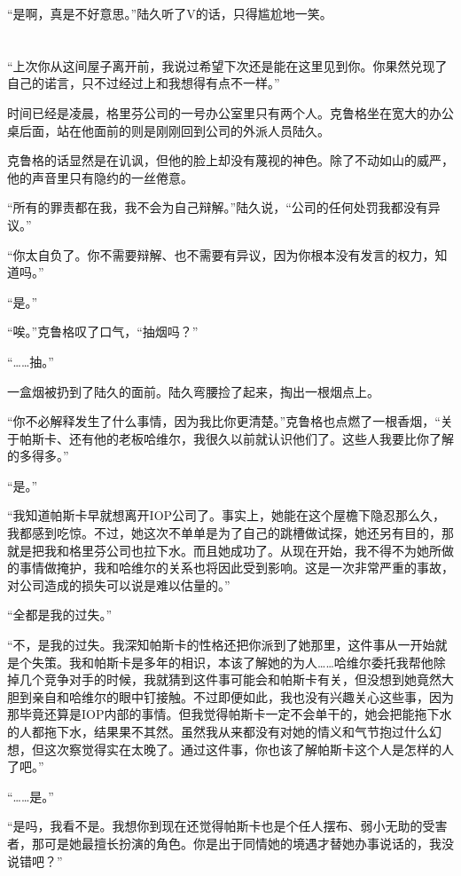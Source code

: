 “是啊，真是不好意思。”陆久听了V的话，只得尴尬地一笑。

\section*{}

“上次你从这间屋子离开前，我说过希望下次还是能在这里见到你。你果然兑现了自己的诺言，只不过经过上和我想得有点不一样。”

时间已经是凌晨，格里芬公司的一号办公室里只有两个人。克鲁格坐在宽大的办公桌后面，站在他面前的则是刚刚回到公司的外派人员陆久。

克鲁格的话显然是在讥讽，但他的脸上却没有蔑视的神色。除了不动如山的威严，他的声音里只有隐约的一丝倦意。

“所有的罪责都在我，我不会为自己辩解。”陆久说，“公司的任何处罚我都没有异议。”

“你太自负了。你不需要辩解、也不需要有异议，因为你根本没有发言的权力，知道吗。”

“是。”

“唉。”克鲁格叹了口气，“抽烟吗？”

“……抽。”

一盒烟被扔到了陆久的面前。陆久弯腰捡了起来，掏出一根烟点上。

“你不必解释发生了什么事情，因为我比你更清楚。”克鲁格也点燃了一根香烟，“关于帕斯卡、还有他的老板哈维尔，我很久以前就认识他们了。这些人我要比你了解的多得多。”

“是。”

“我知道帕斯卡早就想离开IOP公司了。事实上，她能在这个屋檐下隐忍那么久，我都感到吃惊。不过，她这次不单单是为了自己的跳槽做试探，她还另有目的，那就是把我和格里芬公司也拉下水。而且她成功了。从现在开始，我不得不为她所做的事情做掩护，我和哈维尔的关系也将因此受到影响。这是一次非常严重的事故，对公司造成的损失可以说是难以估量的。”

“全都是我的过失。”

“不，是我的过失。我深知帕斯卡的性格还把你派到了她那里，这件事从一开始就是个失策。我和帕斯卡是多年的相识，本该了解她的为人……哈维尔委托我帮他除掉几个竞争对手的时候，我就猜到这件事可能会和帕斯卡有关，但没想到她竟然大胆到亲自和哈维尔的眼中钉接触。不过即便如此，我也没有兴趣关心这些事，因为那毕竟还算是IOP内部的事情。但我觉得帕斯卡一定不会单干的，她会把能拖下水的人都拖下水，结果果不其然。虽然我从来都没有对她的情义和气节抱过什么幻想，但这次察觉得实在太晚了。通过这件事，你也该了解帕斯卡这个人是怎样的人了吧。”

“……是。”

“是吗，我看不是。我想你到现在还觉得帕斯卡也是个任人摆布、弱小无助的受害者，那可是她最擅长扮演的角色。你是出于同情她的境遇才替她办事说话的，我没说错吧？”

